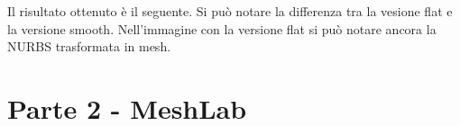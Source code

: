 \vspace{3cm}Il risultato ottenuto è il seguente. Si può notare la differenza tra la vesione flat e la versione smooth. Nell'immagine con la versione flat si può notare ancora la NURBS trasformata in mesh.\\

\begin{figure}[hbt]%
	\vspace{-1cm}
    \centering
	\vspace{-0.2cm}
\end{figure}


\newpage
\section{Parte 2 - MeshLab}
